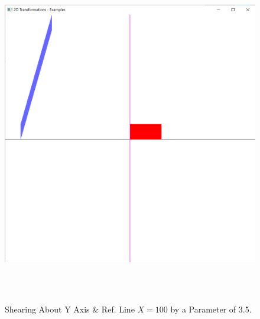 \documentclass[12pt, a4]{article}
\begin{document}
\subsection*{}
\begin{figure}[h]
\centering
\caption{Shearing About Y Axis \& Ref. Line $X = 100$ by a Parameter of 3.5.}
\includegraphics[height=15cm, width=15cm]{Outputs/Output-15.png}
\end{figure}

\newpage
\end{document}
